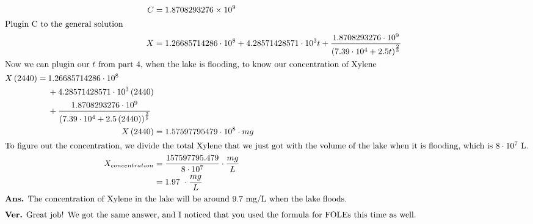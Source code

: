 \documentclass[12pt]{article}
\begin{document}
\begin{align}
  C                                                                                        & =1.8708293276\times10^{9}                                                                                                                                                 \\
  \intertext{Plugin C to the general solution}
  X                                                                                        & =1.26685714286\cdot10^{8}+4.28571428571\cdot10^{3}t+\frac{1.8708293276\cdot10^{9}}{\left(7.39\cdot10^{4}+2.5t\right)^{\frac{2}{5}}}                                       \\
  \intertext{Now we can plugin our $t$ from part 4, when the lake is flooding, to know our concentration of Xylene}
  \begin{split}
  X\left(2440\right)                                                                       =\:&1.26685714286\cdot10^{8}\\
                                                                                            &+4.28571428571\cdot10^{3}\left(2440\right)\\
                                                                                            &+\frac{1.8708293276\cdot10^{9}}{\left(7.39\cdot10^{4}+2.5\left(2440\right)\right)^{\frac{2}{5}}}  \\
  \end{split}\\
  X\left(2440\right)                                                                       & =1.57597795479\cdot10^{8}\cdot mg                                                                                                                                         \\
  \intertext{To figure out the concentration, we divide the total Xylene that we just got with the volume of the lake when it is flooding, which is $8\cdot10^{7}$ L.}
  X_{concentration}                                                                        & =\frac{157597795.479}{8\cdot10^{7}}\cdot\frac{mg}{L}                                                                                                                      \\
                                                                                           & =1.97\ \cdot\frac{mg}{L}                                                                                                                                                  \\
  \intertext{\textbf{Ans.} The concentration of Xylene in the lake will be around 9.7 mg/L when the lake floods.}
  \intertext{\textbf{Ver.} Great job! We got the same answer, and I noticed that you used the formula for FOLEs this time as well.}
\end{align}
\end{document}
